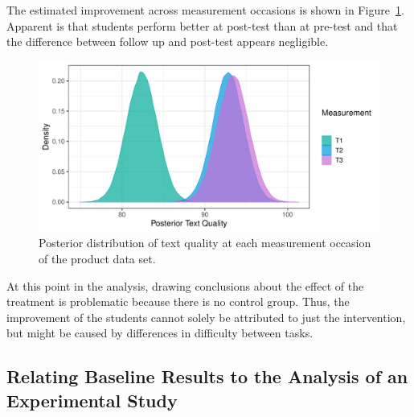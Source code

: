 \documentclass[a4paper]{article}
\begin{document}
The estimated improvement across measurement occasions is shown in Figure~\ref{fig:productPosteriorTextQual}. Apparent is that students perform better at post-test than at pre-test and that the difference between follow up and post-test appears negligible.
\begin{figure}[!ht]
	\centering
	\includegraphics[width=\textwidth]{productPosteriorTextQuality.pdf}
	\caption{Posterior distribution of text quality at each measurement occasion of the product data set.}
	\label{fig:productPosteriorTextQual}
\end{figure}
At this point in the analysis, drawing conclusions about the effect of the treatment is problematic because there is no control group. Thus, the improvement of the students cannot solely be attributed to just the intervention, but might be caused by differences in difficulty between tasks.


\subsection*{Relating Baseline Results to the Analysis of an Experimental Study}
\tbPostMeansProdCC
\end{document}
